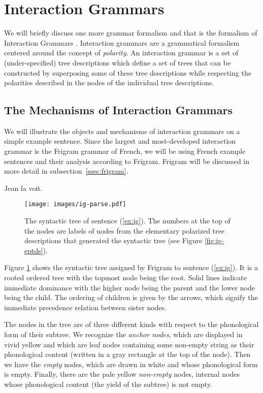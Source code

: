 \section{Interaction Grammars}

We will briefly discuss one more grammar formalism and that is the
formalism of Interaction Grammars \cite{guillaume2009interaction}.
Interaction grammars are a grammatical formalism centered around the
concept of \emph{polarity}. An interaction grammar is a set of
(under-specified) tree descriptions which define a set of trees that can
be constructed by superposing some of these tree descriptions while
respecting the polarities described in the nodes of the individual tree
descriptions.

\subsection{The Mechanisms of Interaction Grammars}

We will illustrate the objects and mechanisms of interaction grammars on
a simple example sentence. Since the largest and most-developed
interaction grammar is the Frigram grammar of French, we will be using
French example sentences and their analysis according to
Frigram. Frigram will be discussed in more detail in
subsection~\ref{ssec:frigram}.

\begin{exe}
  \ex \label{ex:ig} Jean la voit.
\end{exe}

\begin{figure}
  \centering
  \texttt{[image: images/ig-parse.pdf]}
  \caption{\label{fig:ig-parse} The syntactic tree of sentence
    (\ref{ex:ig}). The numbers at the top of the nodes are labels of
    nodes from the elementary polarized tree descriptions that generated
    the syntactic tree (see Figure \ref{fig:ig-eptds}).}
\end{figure}

Figure \ref{fig:ig-parse} shows the syntactic tree assigned by Frigram
to sentence (\ref{ex:ig}). It is a rooted ordered tree with the topmost
node being the root. Solid lines indicate immediate dominance with the
higher node being the parent and the lower node being the child. The
ordering of children is given by the arrows, which signify the immediate
precedence relation between sister nodes.

The nodes in the tree are of three different kinds with respect to the
phonological form of their subtree. We recognize the \emph{anchor
  nodes}, which are displayed in vivid yellow and which are leaf nodes
containing some non-empty string as their phonological content (written
in a gray rectangle at the top of the node). Then we have the
\emph{empty} nodes, which are drawn in white and whose phonological form
is empty. Finally, there are the pale yellow \emph{non-empty} nodes,
internal nodes whose phonological content (the yield of the subtree) is
not empty.

